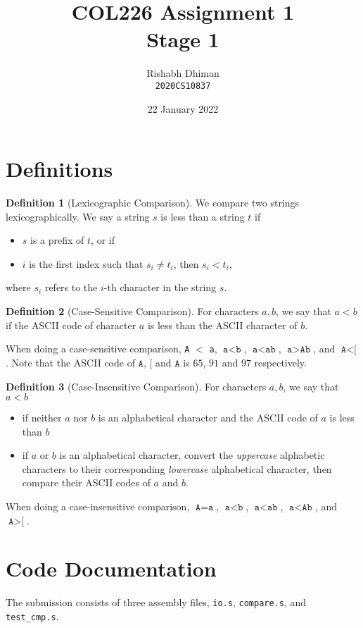 \documentclass[a4paper]{scrartcl}
\title{COL226 Assignment 1\\{\Large Stage 1}}
\date{22 January 2022}
\author{Rishabh Dhiman\\ \texttt{2020CS10837}}
\theoremstyle{definition}
\newtheorem{definition}{Definition}
\renewcommand{\tt}{\texttt}
\begin{document}
\maketitle

\section{Definitions}

\begin{definition}[Lexicographic Comparison]
We compare two strings lexicographically. We say a string $s$ is less than a string $t$ if
\begin{itemize}
	\item $s$ is a prefix of $t$, or if
	\item $i$ is the first index such that $s_i \neq t_i$, then $s_i < t_i$,
\end{itemize}
where $s_i$ refers to the $i$-th character in the string $s$.
\end{definition}

\begin{definition}[Case-Sensitive Comparison]
	For characters $a, b$, we say that $a < b$ if the ASCII code of character $a$ is less than the ASCII character of $b$.
\end{definition}

When doing a case-sensitive comparison, \tt{A} $<$ \tt{a}, $\tt{a} < \tt{b}$, $\tt{a} < \tt{ab}$, $\tt{a} > \tt{Ab}$, and $\tt{A} < \tt{[}$. Note that the ASCII code of $\tt{A}$, $\tt{[}$ and $\tt{A}$ is $65$, $91$ and $97$ respectively.

\begin{definition}[Case-Insensitive Comparison]
	For characters $a, b$, we say that $a < b$
	\begin{itemize}
		\item if neither $a$ nor $b$ is an alphabetical character and the ASCII code of $a$ is less than $b$
		\item if $a$ or $b$ is an alphabetical character, convert the \emph{uppercase} alphabetic characters to their corresponding \emph{lowercase} alphabetical character, then compare their ASCII codes of $a$ and $b$.
	\end{itemize}
\end{definition}

When doing a case-insensitive comparison, $\tt{A} = \tt{a}$, $\tt{a} < \tt{b}$, $\tt{a} < \tt{ab}$, $\tt{a} < \tt{Ab}$, and $\tt{A} > \tt{[}$.


\section{Code Documentation}
The submission consists of three assembly files, \tt{io.s}, \tt{compare.s}, and \tt{test_cmp.s}.
\end{document}
